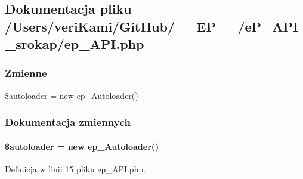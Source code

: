 \hypertarget{ep___a_p_i_8php}{\subsection{Dokumentacja pliku /\-Users/veri\-Kami/\-Git\-Hub/\-\_\-\-\_\-\-E\-P\-\_\-\-\_\-/e\-P\-\_\-\-A\-P\-I\-\_\-srokap/ep\-\_\-\-A\-P\-I.php}
\label{ep___a_p_i_8php}
}
\subsubsection*{Zmienne}
\begin{DoxyCompactItemize}
\item 
\hyperlink{ep___a_p_i_8php_a10137df287727ac9084e9687ab25755c}{\$autoloader} = new \hyperlink{classep___autoloader}{ep\-\_\-\-Autoloader}()
\end{DoxyCompactItemize}


\subsubsection{Dokumentacja zmiennych}
\hypertarget{ep___a_p_i_8php_a10137df287727ac9084e9687ab25755c}{
\paragraph[{\$autoloader}]{\setlength{\rightskip}{0pt plus 5cm}\$autoloader = new {\bf ep\-\_\-\-Autoloader}()}}\label{ep___a_p_i_8php_a10137df287727ac9084e9687ab25755c}


Definicja w linii 15 pliku ep\-\_\-\-A\-P\-I.\-php.

